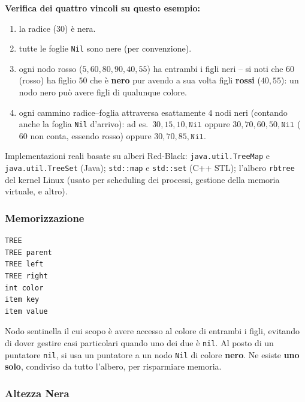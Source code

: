 \documentclass[12pt, a4paper]{article}
\begin{document}
\textbf{Verifica dei quattro vincoli su questo esempio:}
\begin{enumerate}
    \item la radice ($30$) è nera. \checkmark
    \item tutte le foglie \texttt{Nil} sono nere (per convenzione). \checkmark
    \item ogni nodo rosso ($5,60,80,90,40,55$) ha entrambi i figli neri -- si noti che $60$ (rosso) ha figlio $50$ che è \textbf{nero} pur avendo a sua volta figli \textbf{rossi} ($40,55$): un nodo nero può avere figli di qualunque colore. \checkmark
    \item ogni cammino radice--foglia attraversa esattamente $4$ nodi neri (contando anche la foglia \texttt{Nil} d'arrivo): ad es.\ $30,15,10,\texttt{Nil}$ oppure $30,70,60,50,\texttt{Nil}$ ($60$ non conta, essendo rosso) oppure $30,70,85,\texttt{Nil}$. \checkmark
\end{enumerate}

\begin{tcolorbox}[colback=lightergray!5, colframe=tocsubsec, title=\textbf{Reality Check}]
Implementazioni reali basate su alberi Red-Black: \texttt{java.util.TreeMap} e \texttt{java.util.TreeSet} (Java); \texttt{std::map} e \texttt{std::set} (C++ STL); l'albero \texttt{rbtree} del kernel Linux (usato per scheduling dei processi, gestione della memoria virtuale, e altro).
\end{tcolorbox}



\subsubsection{Memorizzazione}

\begin{verbatim}
TREE
TREE parent
TREE left
TREE right
int color
item key
item value
\end{verbatim}

\begin{tcolorbox}[colback=lightergray!5, colframe=tocsubsec, title=\textbf{Nodi \texttt{Nil}}]
Nodo sentinella il cui scopo è avere accesso al colore di entrambi i figli, evitando di dover gestire casi particolari quando uno dei due è \texttt{nil}. Al posto di un puntatore \texttt{nil}, si usa un puntatore a un nodo \texttt{Nil} di colore \textbf{nero}. Ne esiste \textbf{uno solo}, condiviso da tutto l'albero, per risparmiare memoria.
\end{tcolorbox}

\subsubsection{Altezza Nera}
\end{document}
